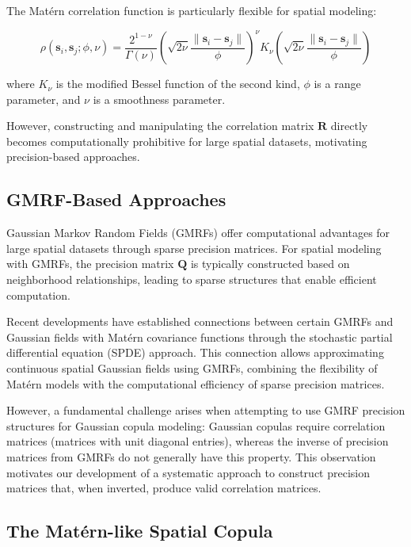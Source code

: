 The Matérn correlation function is particularly flexible for spatial modeling:

\begin{equation}
\rho(\mathbf{s}_i, \mathbf{s}_j; \phi, \nu) = \frac{2^{1-\nu}}{\Gamma(\nu)}\left(\sqrt{2\nu}\frac{\|\mathbf{s}_i - \mathbf{s}_j\|}{\phi}\right)^{\nu}K_{\nu}\left(\sqrt{2\nu}\frac{\|\mathbf{s}_i - \mathbf{s}_j\|}{\phi}\right)
\end{equation}

where $K_{\nu}$ is the modified Bessel function of the second kind, $\phi$ is a range parameter, and $\nu$ is a smoothness parameter.

However, constructing and manipulating the correlation matrix $\mathbf{R}$ directly becomes computationally prohibitive for large spatial datasets, motivating precision-based approaches.

\subsection{GMRF-Based Approaches}
Gaussian Markov Random Fields (GMRFs) offer computational advantages for large spatial datasets through sparse precision matrices. For spatial modeling with GMRFs, the precision matrix $\mathbf{Q}$ is typically constructed based on neighborhood relationships, leading to sparse structures that enable efficient computation.

Recent developments have established connections between certain GMRFs and Gaussian fields with Matérn covariance functions through the stochastic partial differential equation (SPDE) approach. This connection allows approximating continuous spatial Gaussian fields using GMRFs, combining the flexibility of Matérn models with the computational efficiency of sparse precision matrices.

However, a fundamental challenge arises when attempting to use GMRF precision structures for Gaussian copula modeling: Gaussian copulas require correlation matrices (matrices with unit diagonal entries), whereas the inverse of precision matrices from GMRFs do not generally have this property. This observation motivates our development of a systematic approach to construct precision matrices that, when inverted, produce valid correlation matrices.

\subsection{The Matérn-like Spatial Copula}


